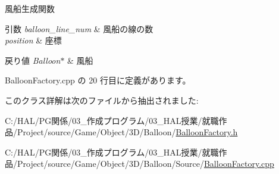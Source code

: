 風船生成関数 


\begin{DoxyParams}{引数}
{\em balloon\+\_\+line\+\_\+num} & 風船の線の数 \\
\hline
{\em position} & 座標 \\
\hline
\end{DoxyParams}

\begin{DoxyRetVals}{戻り値}
{\em Balloon$\ast$} & 風船 \\
\hline
\end{DoxyRetVals}


 Balloon\+Factory.\+cpp の 20 行目に定義があります。



このクラス詳解は次のファイルから抽出されました\+:\begin{DoxyCompactItemize}
\item 
C\+:/\+H\+A\+L/\+P\+G関係/03\+\_\+作成プログラム/03\+\_\+\+H\+A\+L授業/就職作品/\+Project/source/\+Game/\+Object/3\+D/\+Balloon/\mbox{\hyperlink{_balloon_factory_8h}{Balloon\+Factory.\+h}}\item 
C\+:/\+H\+A\+L/\+P\+G関係/03\+\_\+作成プログラム/03\+\_\+\+H\+A\+L授業/就職作品/\+Project/source/\+Game/\+Object/3\+D/\+Balloon/\+Source/\mbox{\hyperlink{_balloon_factory_8cpp}{Balloon\+Factory.\+cpp}}\end{DoxyCompactItemize}
